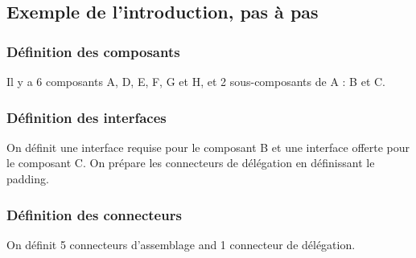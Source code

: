 \documentclass[a4paper,11pt]{report}
\newcommand{\inputTikZ}[1]{%
  }%
\newcommand{\inputTikZ}[1]{%
    \texttt{[image: fig/\#1.pdf]}%
  }%
\begin{document}
\subsection{Exemple de l'introduction, pas à pas}

\subsubsection{Définition des composants}

Il y a 6 composants A, D, E, F, G et H, et 2 sous-composants de A : B et C.

\medskip



\begin{center}
\inputTikZ{compdiagexstep1}
\end{center}

\subsubsection{Définition des interfaces}

On définit une interface requise pour le composant B et une interface offerte pour le composant C. On prépare les connecteurs de délégation en définissant le padding.

\medskip

\vspace{-0.4cm}
{\color{red!70!black} \vspace{-0.4cm}}


\begin{center}
\inputTikZ{compdiagexstep2}
\end{center}

\subsubsection{Définition des connecteurs}

On définit 5 connecteurs d'assemblage and 1 connecteur de délégation.

\medskip

\vspace{-0.4cm}
{\color{red!70!black}}

\begin{center}
\inputTikZ{compdiagexstep3}
\end{center}
\end{document}
